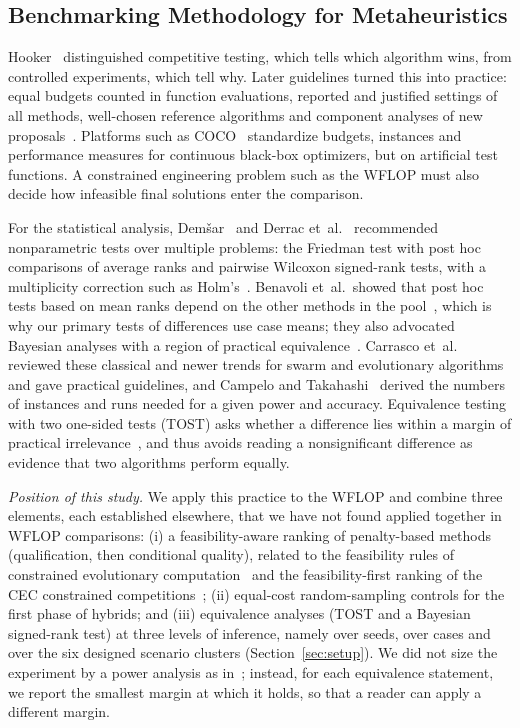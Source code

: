 \subsection{Benchmarking Methodology for Metaheuristics}
\label{sec:related-bench}
Hooker~\cite{Hooker1995} distinguished competitive testing, which tells which algorithm wins, from controlled experiments, which tell why. Later guidelines turned this into practice: equal budgets counted in function evaluations, reported and justified settings of all methods, well-chosen reference algorithms and component analyses of new proposals~\cite{BartzBeielstein2020,LaTorre2021}. Platforms such as COCO~\cite{Hansen2021} standardize budgets, instances and performance measures for continuous black-box optimizers, but on artificial test functions. A constrained engineering problem such as the WFLOP must also decide how infeasible final solutions enter the comparison.

For the statistical analysis, Dem\v{s}ar~\cite{Demsar2006} and Derrac et~al.~\cite{Derrac2011} recommended nonparametric tests over multiple problems: the Friedman test with post hoc comparisons of average ranks and pairwise Wilcoxon signed-rank tests, with a multiplicity correction such as Holm's~\cite{Holm1979}. Benavoli et~al.\ showed that post hoc tests based on mean ranks depend on the other methods in the pool~\cite{Benavoli2016}, which is why our primary tests of differences use case means; they also advocated Bayesian analyses with a region of practical equivalence~\cite{Benavoli2017}. Carrasco et~al.~\cite{Carrasco2020} reviewed these classical and newer trends for swarm and evolutionary algorithms and gave practical guidelines, and Campelo and Takahashi~\cite{Campelo2019} derived the numbers of instances and runs needed for a given power and accuracy. Equivalence testing with two one-sided tests (TOST) asks whether a difference lies within a margin of practical irrelevance~\cite{Lakens2017}, and thus avoids reading a nonsignificant difference as evidence that two algorithms perform equally.

\emph{Position of this study.} We apply this practice to the WFLOP and combine three elements, each established elsewhere, that we have not found applied together in WFLOP comparisons: (i) a feasibility-aware ranking of penalty-based methods (qualification, then conditional quality), related to the feasibility rules of constrained evolutionary computation~\cite{Deb2000} and the feasibility-first ranking of the CEC constrained competitions~\cite{Wu2017}; (ii) equal-cost random-sampling controls for the first phase of hybrids; and (iii) equivalence analyses (TOST and a Bayesian signed-rank test) at three levels of inference, namely over seeds, over cases and over the six designed scenario clusters (Section~\ref{sec:setup}). We did not size the experiment by a power analysis as in~\cite{Campelo2019}; instead, for each equivalence statement, we report the smallest margin at which it holds, so that a reader can apply a different margin.

